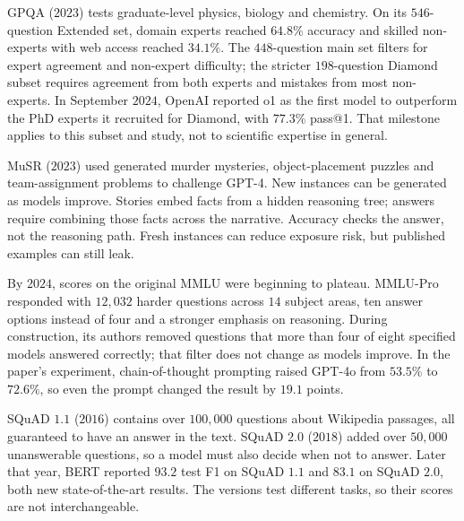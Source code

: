 GPQA ($2023$) tests graduate-level physics, biology and chemistry. On its $546$-question Extended set, domain experts reached $64.8\%$
accuracy and skilled non-experts with web access reached $34.1\%$. The $448$-question main set filters for expert agreement and
non-expert difficulty; the stricter $198$-question Diamond subset requires agreement from both experts and mistakes from most
non-experts. In September $2024$, OpenAI reported o1 as the first model to outperform the PhD experts it recruited for Diamond, with
$77.3\%$ pass@1. That milestone applies to this subset and study, not to scientific expertise in general.


MuSR ($2023$) used generated murder mysteries, object-placement puzzles and team-assignment problems to challenge GPT-4. New instances can be generated as models improve. Stories embed facts from a hidden reasoning tree; answers require combining those facts across the narrative. Accuracy checks the answer, not the reasoning path. Fresh instances can reduce exposure risk, but published examples can still leak.


By $2024$, scores on the original MMLU were beginning to plateau. MMLU-Pro responded with $12{,}032$ harder questions across $14$ subject
areas, ten answer options instead of four and a stronger emphasis on reasoning. During construction, its authors removed questions that
more than four of eight specified models answered correctly; that filter does not change as models improve. In the paper's experiment,
chain-of-thought prompting raised GPT-4o from $53.5\%$ to $72.6\%$, so even the prompt changed the result by $19.1$ points.


SQuAD $1.1$ ($2016$) contains over $100{,}000$ questions about Wikipedia passages, all guaranteed to have an answer in the text. SQuAD
$2.0$ ($2018$) added over $50{,}000$ unanswerable questions, so a model must also decide when not to answer. Later that year, BERT reported
$93.2$ test F1 on SQuAD $1.1$ and $83.1$ on SQuAD $2.0$, both new state-of-the-art results. The versions test different tasks, so their
scores are not interchangeable.

